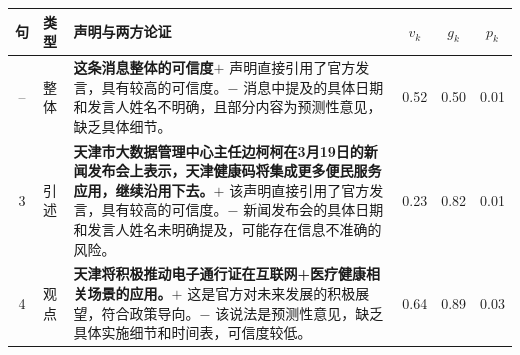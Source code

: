 {\small\begin{tabularx}{\linewidth}{@{}clXccc@{}}
\toprule
句 & 类型 & 声明与两方论证 & $v_k$ & $g_k$ & $p_k$ \\
\midrule
-- & 整体 & \textbf{这条消息整体的可信度}\newline $+$ 声明直接引用了官方发言，具有较高的可信度。\newline $-$ 消息中提及的具体日期和发言人姓名不明确，且部分内容为预测性意见，缺乏具体细节。 & 0.52 & 0.50 & 0.01 \\
3 & 引述 & \textbf{天津市大数据管理中心主任边柯柯在3月19日的新闻发布会上表示，天津健康码将集成更多便民服务应用，继续沿用下去。}\newline $+$ 该声明直接引用了官方发言，具有较高的可信度。\newline $-$ 新闻发布会的具体日期和发言人姓名未明确提及，可能存在信息不准确的风险。 & 0.23 & 0.82 & 0.01 \\
4 & 观点 & \textbf{天津将积极推动电子通行证在互联网+医疗健康相关场景的应用。}\newline $+$ 这是官方对未来发展的积极展望，符合政策导向。\newline $-$ 该说法是预测性意见，缺乏具体实施细节和时间表，可信度较低。 & 0.64 & 0.89 & 0.03 \\
\bottomrule
\end{tabularx}}
\par\medskip
